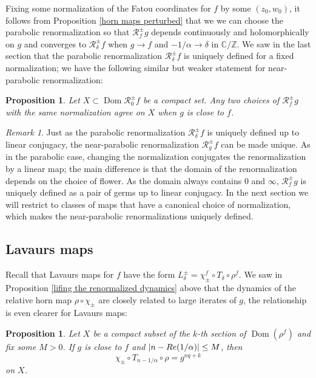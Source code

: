 \documentclass[12pt,letterpaper]{amsart}
\numberwithin{equation}{section}
\newtheorem{prop}[equation]{Proposition}
\newtheorem{proposition}[equation]{Proposition}
\theoremstyle{remark}
\newtheorem{remark}[equation]{Remark}
\theoremstyle{definition}
\newcommand{\C}{\mathbb C}
\newcommand{\Z}{\mathbb Z}
\newcommand{\RR}{\mathcal R}
\DeclareMathOperator{\Dom}{Dom}
\begin{document}
	
	Fixing some normalization of the Fatou coordinates for $f$ by some $(z_0, w_0)$, it follows from Proposition \ref{horn maps perturbed} that we we can choose the parabolic renormalization so that  $\RR_f^\pm g$ depends continuously and holomorphically on $g$ and converges to $\RR_\delta^\pm f$ when $g\to f$ and $-1/\alpha\to \delta$ in $\C/\Z$. 
	We saw in the last section that the parabolic renormalization $\RR_\delta^\pm f$ is uniquely defined for a fixed normalization; we have the following similar but weaker statement for near-parabolic renormalization:
	
	
	\begin{proposition}\label{prop:eventually the same renormalizations}
		Let $X\subset \Dom \mathcal{R}_0^\pm f$ be a compact set. Any two  choices of $\RR_f^\pm g$ with the same normalization agree on $X$ when $g$ is close to $f$.
	\end{proposition} 
	
	
	\begin{remark}
		Just as the parabolic renormalization $\RR^\pm_\delta f$ is uniquely defined up to linear conjugacy, the near-parabolic renormalization $\RR_g^\pm f$ can be made unique. As in the parabolic case, changing the normalization conjugates the renormalization by a linear map; the main difference is that the domain of the renormalization depends on the choice of flower. As the domain always contains $0$ and $\infty$, $\RR_f^\pm g$ is uniquely defined as a pair of germs up to linear conjugacy. In the next section we will restrict to classes of maps that have a canonical choice of normalization, which makes the near-parabolic renormalizations uniquely defined.
	\end{remark}
	
	
	


	
	
	\subsection{Lavaurs maps}
	
	Recall that Lavaurs maps for $f$ have the form $L_\delta^\pm =\chi_\pm^f \circ T_\delta\circ \rho^f$. 
	We saw in Proposition \ref{lifing the renormalized dynamics} above that the dynamics of the relative horn map $\rho \circ \chi_\pm$ are closely related to large iterates of $g$, the relationship is even clearer for Lavaurs maps:
	
	\begin{prop}\label{prop: approximating Lavaurs maps}
		Let  $X$ be a compact subset of the $k$-th section of $\Dom(\rho^f)$ and fix some $M>0$. If $g$ is close to $f$ and $|n- \emph{Re}(1/\alpha)|\leq  M$,  then $$\chi_\pm\circ T_{n-1/\alpha}\circ \rho = g^{nq+k}$$
		on $X$.
	\end{prop}
	
\end{document}
